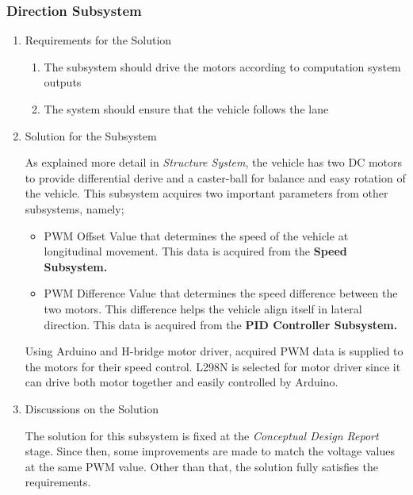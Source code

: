 \documentclass[a4paper,12pt]{article}
\begin{document}
\subsubsection{Direction Subsystem}
	\begin{enumerate}
		\item {Requirements for the Solution}
		
		\begin{enumerate}
			\item The subsystem should drive the motors according to computation system outputs
			\item The system should ensure that the vehicle follows the lane 	
		\end{enumerate}

		\item {Solution for the Subsystem}

		As explained more detail in \textit{Structure System}, the vehicle has two DC motors to provide differential derive and a caster-ball for balance and easy rotation of the vehicle.  This subsystem acquires two important parameters from other subsystems, namely;

		\begin{itemize}
			\item PWM Offset Value that determines the speed of the vehicle at longitudinal movement. This data is acquired from the \textbf{Speed Subsystem.} 	
			\item PWM Difference Value that determines the speed difference between the two motors. This difference helps the vehicle align itself in lateral direction. This data is acquired from the \textbf{PID Controller Subsystem.} 	
		\end{itemize}	
	
	Using Arduino and H-bridge motor driver, acquired PWM data is supplied to the motors for their speed control. L298N is selected for motor driver since it can drive both motor together and easily controlled by Arduino.


	\item {Discussions on the Solution}

		The solution for this subsystem is fixed at the \textit{Conceptual Design Report} stage. Since then, some improvements are made to match the voltage values at the same PWM value. Other than that, the solution fully satisfies the requirements.

	\end{enumerate}


\end{document}
